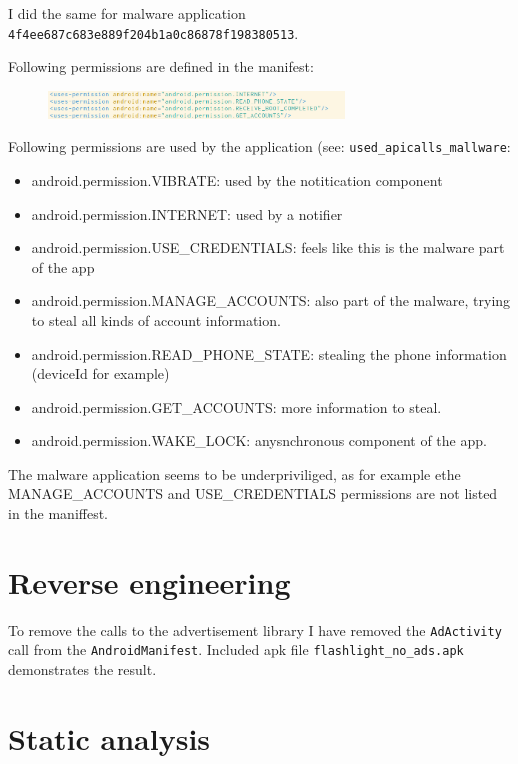 \documentclass[10pt,a4paper]{article}
\begin{document}
I did the same for malware application
\texttt{4f4ee687c683e889f204b1a0c86878f198380513}.

Following permissions are defined in the manifest:

\begin{figure}[h]
  \includegraphics[width=0.7\textwidth]{manifest2}
\end{figure}

Following permissions are used by the application (see:
\texttt{used\_apicalls\_mallware}:
\begin{itemize}
  \item android.permission.VIBRATE: used by the notitication component
  \item android.permission.INTERNET: used by a notifier 
  \item android.permission.USE\_CREDENTIALS: feels like this is the malware part
    of the app
  \item android.permission.MANAGE\_ACCOUNTS: also part of the malware, trying to
    steal all kinds of account information.
  \item android.permission.READ\_PHONE\_STATE: stealing the phone information
    (deviceId for example)
  \item android.permission.GET\_ACCOUNTS: more information to steal.
  \item android.permission.WAKE\_LOCK: anysnchronous component of the app.
\end{itemize}

The malware application seems to be underpriviliged, as for example ethe
MANAGE\_ACCOUNTS and USE\_CREDENTIALS permissions are not listed in the
maniffest.

\section{Reverse engineering}
To remove the calls to the advertisement library I have removed the
\texttt{AdActivity} call from the \texttt{AndroidManifest}. Included apk file
\texttt{flashlight\_no\_ads.apk} demonstrates the result.


\section{Static analysis}
\end{document}
